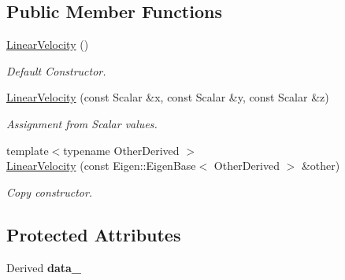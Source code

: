 \subsection*{Public Member Functions}
\begin{DoxyCompactItemize}
\item 
\hyperlink{classow__core_1_1LinearVelocity_af76f6ab631d054f1c09e791197508f7c}{Linear\+Velocity} ()\hypertarget{classow__core_1_1LinearVelocity_af76f6ab631d054f1c09e791197508f7c}{}\label{classow__core_1_1LinearVelocity_af76f6ab631d054f1c09e791197508f7c}

\begin{DoxyCompactList}\small\item\em Default Constructor. \end{DoxyCompactList}\item 
\hyperlink{classow__core_1_1LinearVelocity_a6f4035dbcbcf049bbf20634ec61db290}{Linear\+Velocity} (const Scalar \&x, const Scalar \&y, const Scalar \&z)\hypertarget{classow__core_1_1LinearVelocity_a6f4035dbcbcf049bbf20634ec61db290}{}\label{classow__core_1_1LinearVelocity_a6f4035dbcbcf049bbf20634ec61db290}

\begin{DoxyCompactList}\small\item\em Assignment from Scalar values. \end{DoxyCompactList}\item 
{\footnotesize template$<$typename Other\+Derived $>$ }\\\hyperlink{classow__core_1_1LinearVelocity_abf23b69f78de0e66c5df1d928162ce8f}{Linear\+Velocity} (const Eigen\+::\+Eigen\+Base$<$ Other\+Derived $>$ \&other)
\begin{DoxyCompactList}\small\item\em Copy constructor. \end{DoxyCompactList}\end{DoxyCompactItemize}
\subsection*{Protected Attributes}
\begin{DoxyCompactItemize}
\item 
Derived {\bfseries data\+\_\+}\hypertarget{classow__core_1_1LinearVelocity_a6d1422dafd1952572ddf3fff4dd45630}{}\label{classow__core_1_1LinearVelocity_a6d1422dafd1952572ddf3fff4dd45630}

\end{DoxyCompactItemize}


